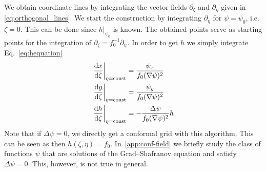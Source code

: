 We obtain coordinate lines by integrating the vector fields $\partial_\zeta$ and $\partial_\eta$ given in \eqref{eq:orthogonal_lines}. We start the construction by integrating $\partial_\eta$ for $\psi = \psi_0$, i.e. $\zeta=0$. This can be done since $h|_{\psi_0}$ is known. 
The obtained points serve as starting points for the integration of $\partial_\zeta = f_0^{-1} \partial_\psi$.
In order to get $h$ we simply integrate Eq.~\eqref{eq:hequation}
\begin{subequations}
\begin{align}
    \left .\frac{\d x}{\d \zeta}\right |_{\eta=\text{const}} &= \frac{\psi_x}{f_0(\nabla\psi)^2}\\
    \left .\frac{\d y}{\d \zeta}\right|_{\eta=\text{const}} &= \frac{\psi_y}{f_0(\nabla\psi)^2}\\
    \left .\frac{\d h}{\d \zeta}\right|_{\eta=\text{const}} &= - \frac{\Delta \psi}{f_0(\nabla\psi)^2} h%
\end{align}
  \label{eq:etacoordinates}
\end{subequations}
Note that if $\Delta\psi=0$, we directly get a conformal grid with this algorithm. This can be seen as then $h(\zeta,\eta) = f_0$. In~\ref{app:conf-field}
we briefly study the class of functions $\psi$ that are solutions of the Grad--Shafranov equation and satisfy $\Delta \psi=0$. This, however, is not true in general.

